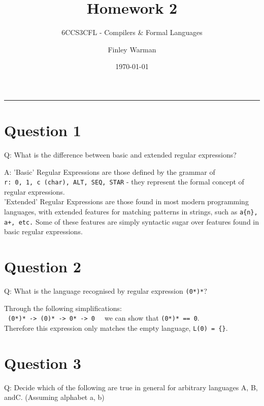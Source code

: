 \documentclass[english]{scrartcl}
\begin{document}


\subtitle{6CCS3CFL - Compilers \& Formal Languages}
\title{Homework 2}
\author{Finley Warman}
\date{\today}

\maketitle


\tableofcontents
\par\noindent\rule{\textwidth}{0.4pt}


\newpage


\section*{Question 1}
Q: What is the difference between basic and extended regular expressions?

A: 'Basic' Regular Expressions are those defined by the grammar of \\
\verb~r: 0, 1, c (char), ALT, SEQ, STAR~ - they represent the formal concept of regular expressions. \\
'Extended' Regular Expressions are those found in most modern programming languages, with extended features for matching patterns in strings,
 such as \verb~a{n}, a+, etc.~ Some of these features are simply
syntactic sugar over features found in basic regular expressions.

\section*{Question 2}
Q: What is the language recognised by regular expression \verb|(0*)*|?

Through the following simplifications: \\
\verb~ (0*)* -> (0)* -> 0* -> 0  ~ we can show that \verb~(0*)* == 0~. \\
Therefore this expression only matches the empty language, \verb~L(0) = {}~.

\section*{Question 3}
Q: Decide which of the following are true in general for arbitrary languages A, B, andC. (Assuming alphabet {a, b})
\end{document}
